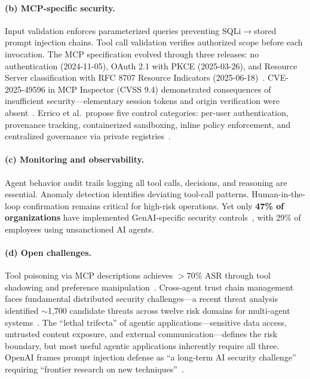 \paragraph{(b) MCP-specific security.}
Input validation enforces parameterized queries preventing SQLi$\to$stored prompt injection chains. Tool call validation verifies authorized scope before each invocation. The MCP specification evolved through three releases: no authentication (2024-11-05), OAuth 2.1 with PKCE (2025-03-26), and Resource Server classification with RFC 8707 Resource Indicators (2025-06-18)~\cite{mcpspec2025}. CVE-2025-49596 in MCP Inspector (CVSS 9.4) demonstrated consequences of insufficient security---elementary session tokens and origin verification were absent~\cite{oligo2025inspector}. Errico et al.\ propose five control categories: per-user authentication, provenance tracking, containerized sandboxing, inline policy enforcement, and centralized governance via private registries~\cite{errico2025mcpsecurity}.

\paragraph{(c) Monitoring and observability.}
Agent behavior audit trails logging all tool calls, decisions, and reasoning are essential. Anomaly detection identifies deviating tool-call patterns. Human-in-the-loop confirmation remains critical for high-risk operations. Yet only \textbf{47\% of organizations} have implemented GenAI-specific security controls~\cite{microsoft2026cyberpulse}, with 29\% of employees using unsanctioned AI agents.

\paragraph{(d) Open challenges.}
Tool poisoning via MCP descriptions achieves $>$70\% ASR through tool shadowing and preference manipulation~\cite{invariant2025toolpoisoning}. Cross-agent trust chain management faces fundamental distributed security challenges---a recent threat analysis identified $\sim$1,700 candidate threats across twelve risk domains for multi-agent systems~\cite{multiagent2026threats}. The ``lethal trifecta'' of agentic applications---sensitive data access, untrusted content exposure, and external communication---defines the risk boundary, but most useful agentic applications inherently require all three. OpenAI frames prompt injection defense as ``a long-term AI security challenge'' requiring ``frontier research on new techniques''~\cite{openai2025atlas}.

\begin{figure}[htbp]
\centering
{}
\end{figure}
